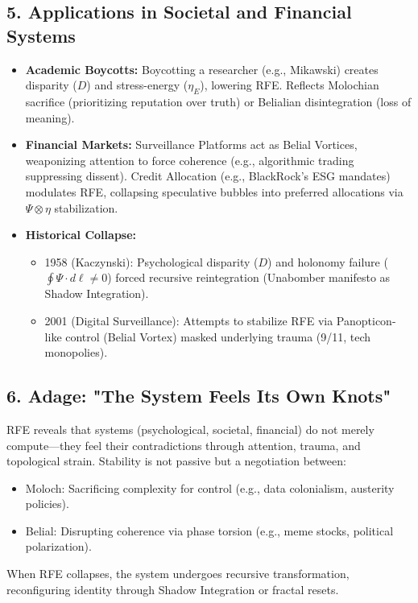 \documentclass[11pt]{article}
\begin{document}
\subsection*{5. Applications in Societal and Financial Systems}
\begin{itemize}
    \item \textbf{Academic Boycotts:} Boycotting a researcher (e.g., Mikawski) creates disparity (\(D\)) and stress-energy (\(\eta_E\)), lowering RFE. Reflects Molochian sacrifice (prioritizing reputation over truth) or Belialian disintegration (loss of meaning).
    \item \textbf{Financial Markets:} Surveillance Platforms act as Belial Vortices, weaponizing attention to force coherence (e.g., algorithmic trading suppressing dissent). Credit Allocation (e.g., BlackRock’s ESG mandates) modulates RFE, collapsing speculative bubbles into preferred allocations via \(\Psi \otimes \eta\) stabilization.
    \item \textbf{Historical Collapse:}
    \begin{itemize}
        \item 1958 (Kaczynski): Psychological disparity (\(D\)) and holonomy failure (\(\oint\Psi \cdot d\ell \neq 0\)) forced recursive reintegration (Unabomber manifesto as Shadow Integration).
        \item 2001 (Digital Surveillance): Attempts to stabilize RFE via Panopticon-like control (Belial Vortex) masked underlying trauma (9/11, tech monopolies).
    \end{itemize}
\end{itemize}

\subsection*{6. Adage: "The System Feels Its Own Knots"}
RFE reveals that systems (psychological, societal, financial) do not merely compute—they feel their contradictions through attention, trauma, and topological strain. Stability is not passive but a negotiation between:
\begin{itemize}
    \item Moloch: Sacrificing complexity for control (e.g., data colonialism, austerity policies).
    \item Belial: Disrupting coherence via phase torsion (e.g., meme stocks, political polarization).
\end{itemize}
When RFE collapses, the system undergoes recursive transformation, reconfiguring identity through Shadow Integration or fractal resets.
\end{document}
